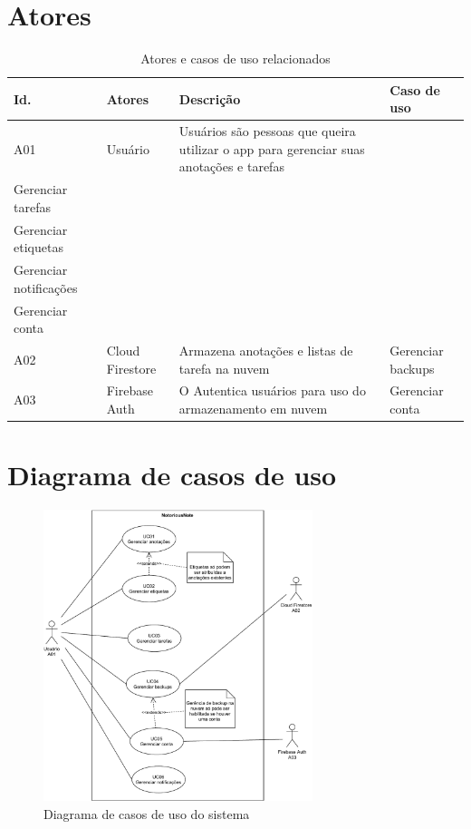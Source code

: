 \documentclass[
	12pt,				%
	oneside,			%
	a4paper,			%
	english,			%
	brazil,				%
	]{abntex2}
\begin{document}
\section{Atores}
\IBGEtabfontsize
\begin{longtable}{@{}llp{}l@{}}
\caption{Atores e casos de uso relacionados}
\label{tab:atores} \\
\toprule
\textbf{Id.} & \textbf{Atores} & \textbf{Descrição} & \textbf{Caso de uso} \\ \midrule
A01 & Usuário & Usuários são pessoas que queira utilizar o app para gerenciar suas anotações e tarefas  & \begin{tabular}{@{}l@{}}Gerenciar anotações \\ Gerenciar tarefas \\ Gerenciar etiquetas \\ Gerenciar notificações \\ Gerenciar conta \end{tabular} \\ \midrule
A02 & Cloud Firestore & Armazena anotações e listas de tarefa na nuvem & Gerenciar backups \\ \midrule
A03 & Firebase Auth & O Autentica usuários para uso do armazenamento em nuvem & Gerenciar conta \\ \bottomrule
\end{longtable}

\section{Diagrama de casos de uso}
\begin{figure}[htb]
    \centering
    \includegraphics[keepaspectratio=true,width=0.7\textwidth]{notoriousnote-casos-de-uso.pdf}
    \caption{Diagrama de casos de uso do sistema}
    \label{fig:diagrama_casos_uso}
\end{figure}
\end{document}

